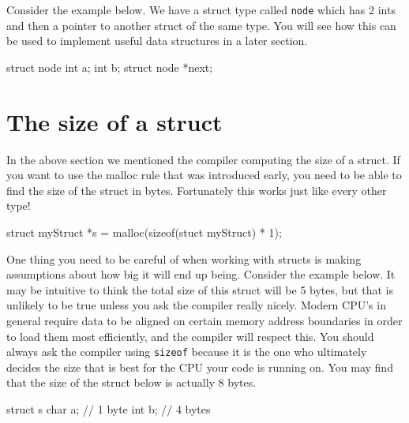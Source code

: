 Consider the example below.
We have a struct type called \texttt{node} which has 2 ints and then a pointer to another struct of the same type.
You will see how this can be used to implement useful data structures in a later section.

\begin{codeblock}
struct node {
    int a;
    int b;
    struct node *next;
}
\end{codeblock}

\section{The size of a struct}

In the above section we mentioned the compiler computing the size of a struct.
If you want to use the malloc rule that was introduced early, you need to be able to find the size of the struct in bytes.
Fortunately this works just like every other type!

\begin{codeinline}
struct myStruct *s = malloc(sizeof(stuct myStruct) * 1);
\end{codeinline}

One thing you need to be careful of when working with structs is making assumptions about how big it will end up being.
Consider the example below.
It may be intuitive to think the total size of this struct will be 5 bytes, but that is unlikely to be true unless you ask the compiler really nicely.
Modern CPU's in general require data to be aligned on certain memory address boundaries in order to load them most efficiently, and the compiler will respect this.
You should always ask the compiler using \texttt{sizeof} because it is the one who ultimately decides the size that is best for the CPU your code is running on.
You may find that the size of the struct below is actually 8 bytes.

\begin{codeblock}
struct s {
    char a; // 1 byte
    int b; // 4 bytes
}
\end{codeblock}

